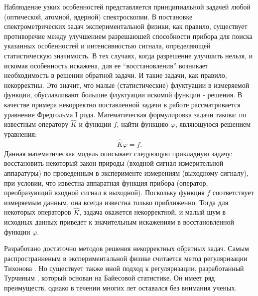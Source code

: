 
Наблюдение узких особенностей представляется принципиальной задачей любой (оптической, атомной, ядерной) спектроскопии. В постановке спектрометрических задач экспериментальной физики, как правило, существует противоречие между улучшением разрешаюшей способности прибора для поиска указанных особенностей и интенсивностью сигнала, определяющей статистическую значимость. В тех случаях, когда разрешение улучшить нельзя, и искомая особенность искажена, для ее ``восстановления'' возникает необходимость в решении обратной задачи.
И такие задачи, как правило, некорректны. Это значит, что малые (статистические) флуктуации в измеряемой функции, обуславливают большие флуктуации искомой функции - решения.
В качестве примера некорректно поставленной задачи в работе рассматривается уравнение Фредгольма I рода. Математическая формулировка задачи такова: по известным оператору $\hat{K}$ и функции $f$, найти функцию $\varphi$, являющуюся решением уравнения:
\begin{equation}
\hat{K}\varphi = f.
\label{eq:opereq}
\end{equation}
Данная математическая модель описывает следующую прикладную задачу: восстановить некоторый закон природы (входной сигнал измерительной аппаратуры) по проведенным в эксперименте измерениям (выходному сигналу), при условии, что известна аппаратная функция прибора (оператор, преобразующий входной сигнал в выходной). Поскольку функция $f$ соответствует измеряемым данным, она всегда известна только приближенно. Тогда для некоторых операторов $\hat{K}$, задача окажется некорректной, и малый шум в исходных данных приведет к значительным искажениям в восстановленной функции $\varphi$. 

Разработано достаточно методов решения некорректных обратных задач. Самым распространненым в экспериментальной физике считается метод регуляризации Тихонова \cite{tihonov}. Но существует также иной подход к регуляризации, разработанный Турчиным \cite{turchin}, который основан на Байесовой статистике. Он имеет ряд преимуществ, однако в течении многих лет оставался без внимания ученых. 